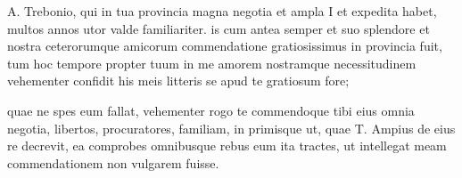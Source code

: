 


 A. Trebonio, qui in tua provincia magna negotia et ampla I et expedita habet, multos annos utor valde familiariter. is cum antea semper et suo splendore et nostra ceterorumque amicorum commendatione gratiosissimus in provincia fuit, tum hoc tempore propter tuum in me amorem nostramque necessitudinem vehementer confidit his meis litteris se apud te gratiosum fore;

 quae ne spes eum fallat, vehementer rogo te commendoque tibi eius omnia negotia, libertos, procuratores, familiam, in primisque ut, quae T. Ampius de eius re decrevit, ea comprobes omnibusque rebus eum ita tractes, ut intellegat meam commendationem non vulgarem fuisse.
